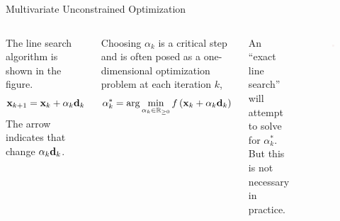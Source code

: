 \documentclass[aspectratio=169]{beamer}
\def\mf{\ensuremath\mathbf}
\def\mb{\ensuremath\mathbb}
\def\lp{\ensuremath\left(}
\def\rp{\ensuremath\right)}
\def\R{\ensuremath\mb{R}}
\newcommand{\ct}[1]{\lp #1\rp}
\begin{document}
\begin{frame} {Multivariate Unconstrained Optimization}
  \begin{columns}
    The line search algorithm is shown in the figure.
    \[ \mf{x}_{k+1} = \mf{x}_{k} + \alpha_k \mf{d}_{k} \]
    The arrow indicates that change $\alpha_k \mf{d}_k$.

    Choosing $\alpha_k$ is a critical step and is often posed as a one-dimensional optimization problem at each iteration $k$,
    \[ \alpha_k^* = \arg \min_{\alpha_k \in \R_{\geq 0}} f\ct{\mf{x}_k  +\alpha_k \mf{d}_k} \]

    An ``exact line search'' will attempt to solve for $\alpha_k^*$. But this is not necessary in practice.
    \begin{figure}
      \centering
      \includegraphics[width=0.9\textwidth]{figs/multivar_linesearch.pdf}
    \end{figure}
  \end{columns}
\end{frame}
\end{document}
